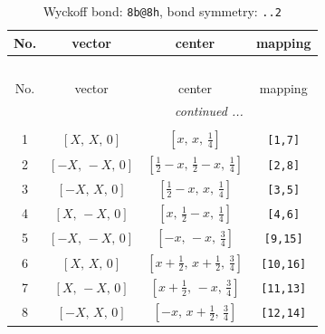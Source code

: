 \documentclass[fleqn,8pt]{jsarticle}
\begin{document}
\renewcommand{\arraystretch}{1.2}
\begin{longtable}{cccc}
\caption{Wyckoff bond: {\tt 8b@8h}, bond symmetry: {\tt ..2}}
 \\
 \hline \hline
No. & vector & center & mapping \\ \hline \endfirsthead

\multicolumn{3}{l}{\tablename\ \thetable{}} \\
 \hline \hline
No. & vector & center & mapping \\ \hline \endhead

 \hline \hline
\multicolumn{3}{r}{\footnotesize\it continued ...} \\ \endfoot

 \hline \hline
\multicolumn{3}{r}{} \\ \endlastfoot

1 & $\left[ X,\, X,\, 0 \right]$ & $\left[ x,\, x,\, \frac{1}{4} \right]$ & {\tt [1,7]} \\ \hline
2 & $\left[ - X,\, - X,\, 0 \right]$ & $\left[ \frac{1}{2} - x,\, \frac{1}{2} - x,\, \frac{1}{4} \right]$ & {\tt [2,8]} \\ \hline
3 & $\left[ - X,\, X,\, 0 \right]$ & $\left[ \frac{1}{2} - x,\, x,\, \frac{1}{4} \right]$ & {\tt [3,5]} \\ \hline
4 & $\left[ X,\, - X,\, 0 \right]$ & $\left[ x,\, \frac{1}{2} - x,\, \frac{1}{4} \right]$ & {\tt [4,6]} \\ \hline
5 & $\left[ - X,\, - X,\, 0 \right]$ & $\left[ - x,\, - x,\, \frac{3}{4} \right]$ & {\tt [9,15]} \\ \hline
6 & $\left[ X,\, X,\, 0 \right]$ & $\left[ x + \frac{1}{2},\, x + \frac{1}{2},\, \frac{3}{4} \right]$ & {\tt [10,16]} \\ \hline
7 & $\left[ X,\, - X,\, 0 \right]$ & $\left[ x + \frac{1}{2},\, - x,\, \frac{3}{4} \right]$ & {\tt [11,13]} \\ \hline
8 & $\left[ - X,\, X,\, 0 \right]$ & $\left[ - x,\, x + \frac{1}{2},\, \frac{3}{4} \right]$ & {\tt [12,14]} \\
\end{longtable}
\renewcommand{\arraystretch}{1.2}
\end{document}
